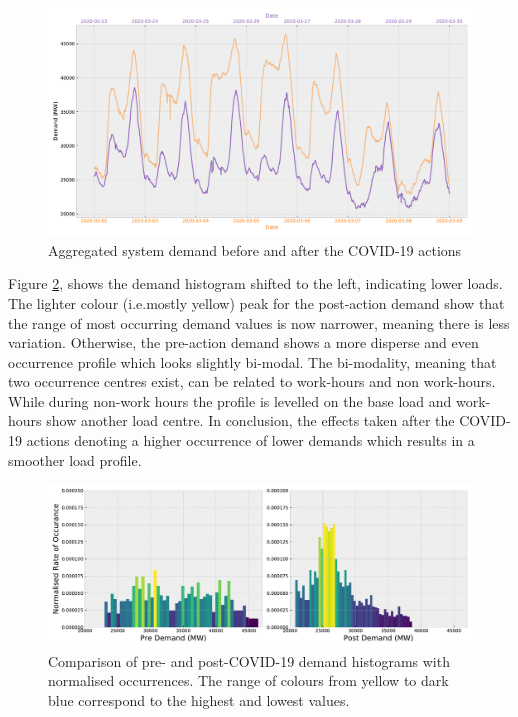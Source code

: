 \documentclass[energies,article,submit,moreauthors,pdftex]{Definitions/mdpi}
\begin{document}
\begin{figure}[H]
\centering
\hspace{-25pt}\includegraphics[width=15 cm]{Graphics/Demand_profiles.pdf}
\caption{Aggregated system demand before and after the COVID-19 actions}\label{fig:demand_profiles}
\end{figure}  

Figure \ref{fig:Demand_hist}, shows the demand histogram shifted to the left, indicating lower loads. The lighter colour (i.e.mostly yellow) peak for the post-action demand show that the range of most occurring demand values is now narrower, meaning there is less variation. Otherwise, the pre-action demand shows a more disperse and even occurrence profile which looks slightly bi-modal. The bi-modality, meaning that two occurrence centres exist, can be related to work-hours and non work-hours. While during non-work hours the profile is levelled on the base load and work-hours show another load centre. In conclusion, the effects taken after the COVID-19 actions denoting a higher occurrence of lower demands which results in a smoother load profile.


\begin{figure}[H] 
\centering
\hspace{-25pt}\includegraphics[width=16.5 cm]{Graphics/Demand_hist_coloured_sidebyside.pdf}
\caption{Comparison of pre- and post-COVID-19 demand histograms with normalised occurrences. The range of colours from yellow to dark blue correspond to the highest and lowest values.}\label{fig:Demand_hist}
\end{figure}  
\end{document}
